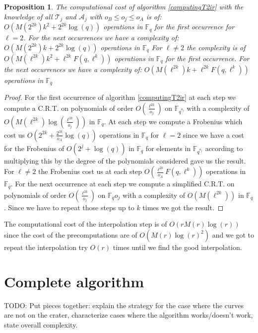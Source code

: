 \documentclass{lms}
\newcommand{\todo}[1]{{\color{red}TODO: #1}}
\newtheorem{prop}[thm]{Proposition}
\begin{document}
\begin{prop} %
The computational cost of algorithm \ref{computingT2ir} with the knowledge of all $\mathcal{T}_j$ and $\mathcal{A}_j$ with $  o_B \leqslant o_j \leqslant o_A$  is of:
$O(M(2^{2k})k^2+ 2^{2k}\log(q))
$
operations in $\mathbb{F}_q$ for the first occurrence for $\ell=2$. For the next occurrences we have a complexity of:
$
O(M(2^{2k})k+2^{2k}\log(q))
$
operations in $\mathbb{F}_q$
\newline For $\ell \neq 2$ the complexity is of $
O(M(\ell^{2k})k^2+ \ell^{2k}F(q,\ell^k))
$
operations in $\mathbb{F}_q$ for the first occurrence. For the next occurrences we have a complexity of:
$
O(M(\ell^{2k})k+\ell^{2k}F(q,\ell^k))
$
operations in $\mathbb{F}_q$

\end{prop}

\begin{proof}
For the first occurrence of algorithm \ref{computingT2ir} at each step we compute a C.R.T. on polynomials of order $O(\frac{\ell^{2k}}{o_j})$ on $\mathbb{F}_{q^{o_j}}$ with a complexity of $O(M(\ell^{2k})\log(\frac{\ell^{2k}}{o_j}))$ in $\mathbb{F}_q$. At each step we compute a Frobenius which cost us $O(2^{2k}+\frac{2^{2k}}{o_A}\log(q))$ operations in $\mathbb{F}_q$ for $\ell=2$ since we have a cost for the Frobenius of $O(2^j+\log(q))$ in $\mathbb{F}_{q}$ for elements in $\mathbb{F}_{q^{o_{j}}}$ according to \cite{DoSc12} multiplying this by the degree of the polynomials considered gave us the result. For $\ell \neq 2$ the Frobenius cost us at each step $O(\frac{\ell^{2k}}{o_A}F(q,\ell^k))$ operations in $\mathbb{F}_q$.
 For the next occurrence at each step we compute a simplified C.R.T. on polynomials of order $O(\frac{\ell^{2k}}{o_j})$ on $\mathbb{F}_q{o_j}$ with a complexity of $O(M(\ell^{2k}))$ in $\mathbb{F}_q$.
Since we have to repeat those steps up to $k$ times we got the result.
\end{proof}


The computational cost of the interpolation step is of $O(rM(r)\log(r))$ since the cost of the precomputations are of $O(M(r)\log(r)^2)$ and we got to repeat the interpolation try $O(r)$ times until we find the good interpolation.


\section{Complete algorithm}
\label{sec:complete-algorithm}
\todo{Put pieces together: explain the strategy for the case where the
  curves are not on the crater, characterize cases where the algorithm
  works/doesn't work, state overall complexity.}
  
\end{document}
